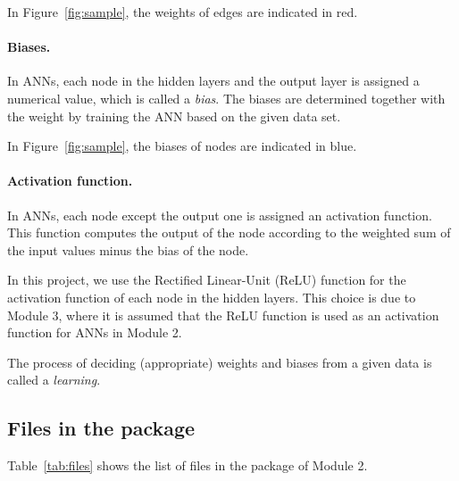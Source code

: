 \documentclass[11pt,titlepage,dvipdfmx,twoside]{book}
\newcommand{\tabref}[1]{Table~\ref{tab:#1}}
\newcommand{\figref}[1]{Figure~\ref{fig:#1}}
\begin{document}
In \figref{sample}, the weights of edges are indicated in red. 


\paragraph{Biases.}
In ANNs, each node in the hidden layers and the output layer
is assigned a numerical value, which is called a {\em bias}.
The biases are determined together 
with the weight by training the ANN based on the given data set. 

In \figref{sample}, the biases of nodes are indicated in blue. 



\paragraph{Activation function.}
In ANNs, each node except the output one is assigned an activation function.
This function computes the output of the node
according to the weighted sum of the input values minus the bias of the node.

In this project, we use the Rectified Linear-Unit (ReLU) function
for the activation function of each node in the hidden layers.
This choice is due to Module 3, 
where it is assumed that the ReLU function is used
as an activation function for ANNs in Module 2.

\medskip

The process of deciding (appropriate) weights and biases
from a given data is called a {\em learning}.


\subsection{Files in the package}
\tabref{files} shows the list of files in the package of Module 2. 
\end{document}
